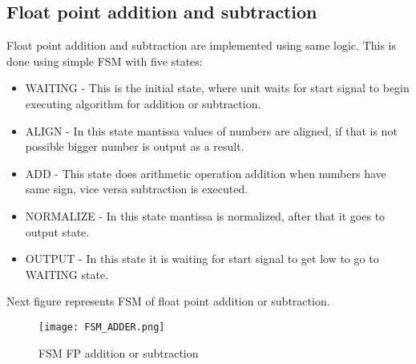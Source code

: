 \documentclass{scrreprt}
\begin{document}
\subsection*{Float point addition and subtraction}
Float point addition and subtraction are implemented using same logic. This is done using simple FSM with five states: 
\begin{itemize}
    \item  WAITING - This is the initial state, where unit waits for start signal to begin executing algorithm for addition or subtraction. 
    \item  ALIGN - In this state mantissa values of numbers are aligned, if that is not possible bigger number is output as a result. 
    \item  ADD - This state does arithmetic operation addition when numbers have same sign, vice versa subtraction is executed.
    \item  NORMALIZE - In this state mantissa is normalized, after that it goes to output state. 
    \item  OUTPUT - In this state it is waiting for start signal to get low to go to WAITING state. 
\end{itemize}
Next figure represents FSM of float point addition or subtraction. 
\begin{figure}[htb!]
    \centering
    \texttt{[image: FSM\_ADDER.png]}
    \caption{FSM FP addition or subtraction}
    \label{fig:FPa}
\end{figure}
\end{document}
